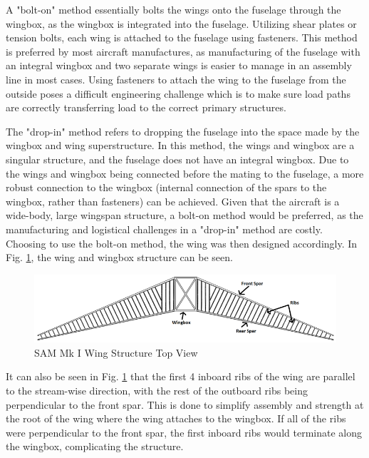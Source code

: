 A "bolt-on" method essentially bolts the wings onto the fuselage through the wingbox, as the wingbox is integrated into the fuselage. Utilizing shear plates or tension bolts, each wing is attached to the fuselage using fasteners. This method is preferred by most aircraft manufactures, as manufacturing of the fuselage with an integral wingbox and two separate wings is easier to manage in an assembly line in most cases. Using fasteners to attach the wing to the fuselage from the outside poses a difficult engineering challenge which is to make sure load paths are correctly transferring load to the correct primary structures.

The "drop-in" method refers to dropping the fuselage into the space made by the wingbox and wing superstructure. In this method, the wings and wingbox are a singular structure, and the fuselage does not have an integral wingbox. Due to the wings and wingbox being connected before the mating to the fuselage, a more robust connection to the wingbox (internal connection of the spars to the wingbox, rather than fasteners) can be achieved. 
Given that the aircraft is a wide-body, large wingspan structure, a bolt-on method would be preferred, as the manufacturing and logistical challenges in a "drop-in" method are costly. Choosing to use the bolt-on method, the wing was then designed accordingly. In Fig. \ref{fig:wing_structure}, the wing and wingbox structure can be seen.

\begin{figure}[!h]
    \centering
    \includegraphics[width=\linewidth]{Photos/structuresandloads/Wing Structure.PNG}
    \caption{SAM Mk I Wing Structure Top View}
    \label{fig:wing_structure}
\end{figure}
\FloatBarrier

It can also be seen in Fig. \ref{fig:wing_structure} that the first 4 inboard ribs of the wing are parallel to the stream-wise direction, with the rest of the outboard ribs being perpendicular to the front spar. This is done to simplify assembly and strength at the root of the wing where the wing attaches to the wingbox. If all of the ribs were perpendicular to the front spar, the first inboard ribs would terminate along the wingbox, complicating the structure.

